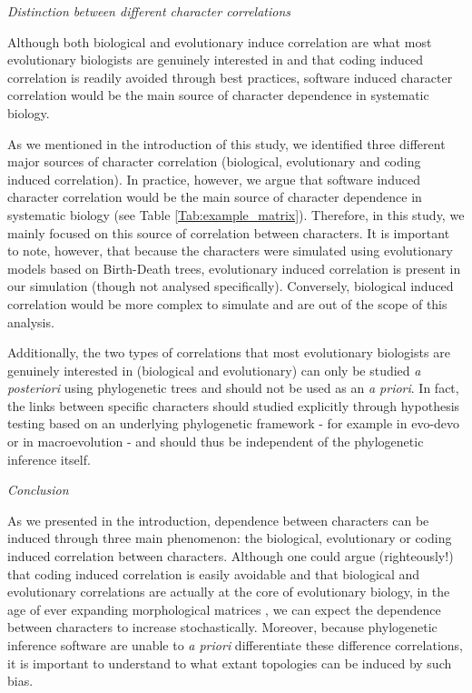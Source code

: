 \documentclass[12pt,letterpaper]{article}
\renewcommand{\subsection}[1]{%
\bigskip
\begin{center}
\begin{large}
\normalfont\itshape #1
\end{large}
\end{center}}
\begin{document}
\subsection{Distinction between different character correlations}
Although both biological and evolutionary induce correlation are what most evolutionary biologists are genuinely interested in and that coding induced correlation is readily avoided through best practices, software induced character correlation would be the main source of character dependence in systematic biology.

As we mentioned in the introduction of this study, we identified three different major sources of character correlation (biological, evolutionary and coding induced correlation).
In practice, however, we argue that software induced character correlation would be the main source of character dependence in systematic biology (see Table \ref{Tab:example_matrix}).
Therefore, in this study, we mainly focused on this source of correlation between characters.
It is important to note, however, that because the characters were simulated using evolutionary models based on Birth-Death trees, evolutionary induced correlation is present in our simulation (though not analysed specifically).
Conversely, biological induced correlation would be more complex to simulate and are out of the scope of this analysis.

Additionally, the two types of correlations that most evolutionary biologists are genuinely interested in (biological and evolutionary) can only be studied \textit{a posteriori} using phylogenetic trees and should not be used as an \textit{a priori}.
In fact, the links between specific characters should studied explicitly through hypothesis testing based on an underlying phylogenetic framework - for example in evo-devo \citep[e.g.][]{goswami2006morphological} or in macroevolution \citep[e.g.][]{fitzjohn2014much} - and should thus be independent of the phylogenetic inference itself.


\subsection{Conclusion}
As we presented in the introduction, dependence between characters can be induced through three main phenomenon: the biological, evolutionary or coding induced correlation between characters.
Although one could argue (righteously!) that coding induced correlation is easily avoidable and that biological and evolutionary correlations are actually at the core of evolutionary biology, in the age of ever expanding morphological matrices \citep[e.g.][with more than 1000 characters each]{nithe2013,O'Leary08022013}, we can expect the dependence between characters to increase stochastically.
Moreover, because phylogenetic inference software are unable to \textit{a priori} differentiate these difference correlations, it is important to understand to what extant topologies can be induced by such bias.
\end{document}

